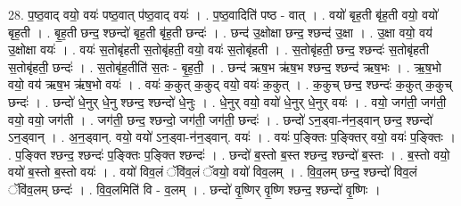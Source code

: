 \documentclass[17pt]{extarticle}
\begin{document}
28. प॒ष्ठ॒वाद् वयो॒ वयः॑ पष्ठ॒वात् प॑ष्ठ॒वाद् वयः॑ । . प॒ष्ठ॒वादिति॑ पष्ठ - वात् । . वयो॑ बृह॒ती बृ॑ह॒ती वयो॒ वयो॑ बृह॒ती । . बृ॒ह॒ती छन्द॒ श्छन्दो॑ बृह॒ती बृ॑ह॒ती छन्दः॑ । . छन्द॑ उ॒क्षोक्षा छन्द॒ श्छन्द॑ उ॒क्षा । . उ॒क्षा वयो॒ वय॑ उ॒क्षोक्षा वयः॑ । . वयः॑ स॒तोबृ॑हती स॒तोबृ॑हती॒ वयो॒ वयः॑ स॒तोबृ॑हती । . स॒तोबृ॑हती॒ छन्द॒ श्छन्दः॑ स॒तोबृ॑हती स॒तोबृ॑हती॒ छन्दः॑ । . स॒तोबृ॑ह॒तीति॑ स॒तः - बृ॒ह॒ती॒ । . छन्द॑ ऋष॒भ ऋ॑ष॒भ श्छन्द॒ श्छन्द॑ ऋष॒भः । . ऋ॒ष॒भो वयो॒ वय॑ ऋष॒भ ऋ॑ष॒भो वयः॑ । . वयः॑ क॒कुत् क॒कुद् वयो॒ वयः॑ क॒कुत् । . क॒कुच् छन्द॒ श्छन्दः॑ क॒कुत् क॒कुच् छन्दः॑ । . छन्दो॑ धे॒नुर् धे॒नु श्छन्द॒ श्छन्दो॑ धे॒नुः । . धे॒नुर् वयो॒ वयो॑ धे॒नुर् धे॒नुर् वयः॑ । . वयो॒ जग॑ती॒ जग॑ती॒ वयो॒ वयो॒ जग॑ती । . जग॑ती॒ छन्द॒ श्छन्दो॒ जग॑ती॒ जग॑ती॒ छन्दः॑ । . छन्दो॑ ऽन॒ड्वा-न॑न॒ड्वान् छन्द॒ श्छन्दो॑ ऽन॒ड्वान् । . अ॒न॒ड्वान्. वयो॒ वयो॑ ऽन॒ड्वा-न॑न॒ड्वान्. वयः॑ । . वयः॑ प॒ङ्क्तिः प॒ङ्क्तिर् वयो॒ वयः॑ प॒ङ्क्तिः । . प॒ङ्क्ति श्छन्द॒ श्छन्दः॑ प॒ङ्क्तिः प॒ङ्क्ति श्छन्दः॑ । . छन्दो॑ ब॒स्तो ब॒स्त श्छन्द॒ श्छन्दो॑ ब॒स्तः । . ब॒स्तो वयो॒ वयो॑ ब॒स्तो ब॒स्तो वयः॑ । . वयो॑ विव॒लं ॅवि॑व॒लं ॅवयो॒ वयो॑ विव॒लम् । . वि॒व॒लम् छन्द॒ श्छन्दो॑ विव॒लं ॅवि॑व॒लम् छन्दः॑ । . वि॒व॒लमिति॑ वि - व॒लम् । . छन्दो॑ वृ॒ष्णिर् वृ॒ष्णि श्छन्द॒ श्छन्दो॑ वृ॒ष्णिः । \newline
\end{document}

